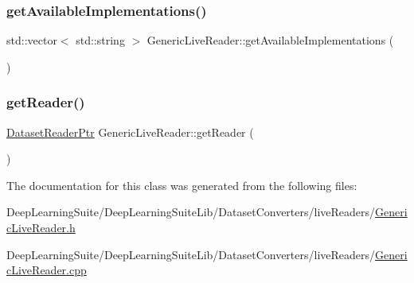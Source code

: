 \subsubsection{\texorpdfstring{get\+Available\+Implementations()}{getAvailableImplementations()}}
{\footnotesize\ttfamily std\+::vector$<$ std\+::string $>$ Generic\+Live\+Reader\+::get\+Available\+Implementations (\begin{DoxyParamCaption}{ }\end{DoxyParamCaption})\hspace{0.3cm}{\ttfamily [static]}}

\mbox{\label{class_generic_live_reader_affd8e47c049501f8e83ab12aafb482ee}} 
\subsubsection{\texorpdfstring{get\+Reader()}{getReader()}}
{\footnotesize\ttfamily \hyperlink{_dataset_reader_8h_a30d89cba514a220d64d04535c0465f1c}{Dataset\+Reader\+Ptr} Generic\+Live\+Reader\+::get\+Reader (\begin{DoxyParamCaption}{ }\end{DoxyParamCaption})}



The documentation for this class was generated from the following files\+:\begin{DoxyCompactItemize}
\item 
Deep\+Learning\+Suite/\+Deep\+Learning\+Suite\+Lib/\+Dataset\+Converters/live\+Readers/\hyperlink{_generic_live_reader_8h}{Generic\+Live\+Reader.\+h}\item 
Deep\+Learning\+Suite/\+Deep\+Learning\+Suite\+Lib/\+Dataset\+Converters/live\+Readers/\hyperlink{_generic_live_reader_8cpp}{Generic\+Live\+Reader.\+cpp}\end{DoxyCompactItemize}
